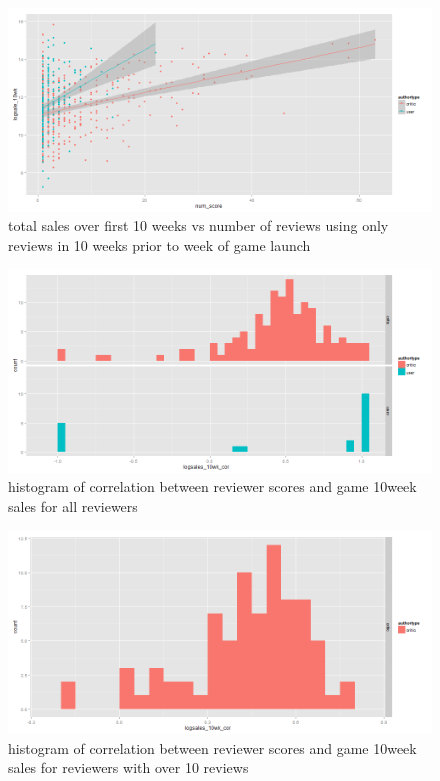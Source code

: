 \documentclass[letterpaper]{article}
\begin{document}
\begin{figure}[tbph]
\centering
\includegraphics[width=\linewidth]{./sales_10wk_vs_numscore_pre10}
\caption{total sales over first 10 weeks vs number of reviews using only reviews in 10 weeks prior to week of game launch}
\label{fig:sales_10wk_vs_reviewnum_pre10}
\end{figure}

\begin{figure}[tbph]
\centering
\includegraphics[width=\linewidth]{./correlation_10wk_sales_all}
\caption{histogram of correlation between reviewer scores and game 10week sales for all reviewers}
\label{fig:corr_10wksales_all}
\end{figure}

\begin{figure}[tbph]
\centering
\includegraphics[width=\linewidth]{./correlation_10wk_sales_over10reviews}
\caption{histogram of correlation between reviewer scores and game 10week sales for reviewers with over 10 reviews}
\label{fig:corr_10wksales_over10}
\end{figure}
\end{document}
